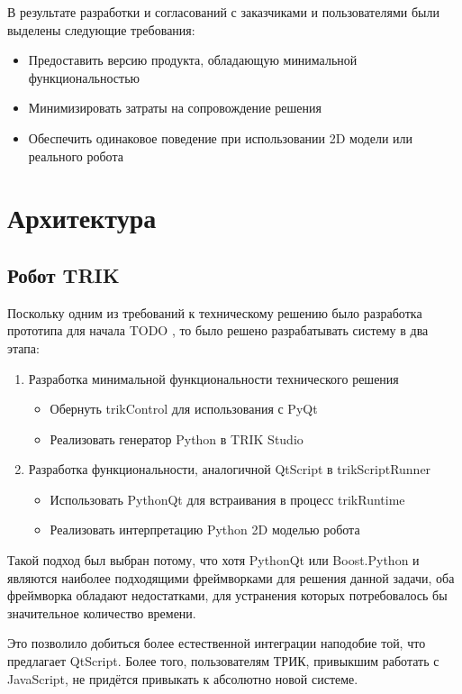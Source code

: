 \documentclass[14pt]{matmex-diploma-custom}
\begin{document}
В результате разработки и согласований с заказчиками и пользователями были выделены следующие требования:
\begin{itemize}
    \item Предоставить версию продукта, обладающую минимальной функциональностью
    \item Минимизировать затраты на сопровождение решения
    \item Обеспечить одинаковое поведение при использовании 2D модели или реального робота
\end{itemize}



\section{Архитектура}
\subsection{Робот TRIK}
Поскольку одним из требований к техническому решению было разработка прототипа для начала TODO , то было решено разрабатывать систему в два этапа:
\begin{enumerate}
    \item Разработка минимальной функциональности технического решения
    \begin{itemize}
        \item Обернуть trikControl для использования с PyQt
        \item Реализовать генератор Python в TRIK Studio
    \end{itemize}
    \item Разработка функциональности, аналогичной QtScript в trikScriptRunner
    \begin{itemize}
        \item Использовать PythonQt для встраивания в процесс trikRuntime
        \item Реализовать интерпретацию Python 2D моделью робота
    \end{itemize}
\end{enumerate} 

Такой подход был выбран потому, что хотя PythonQt или Boost.Python и являются наиболее подходящими фреймворками для решения данной задачи, оба фреймворка обладают недостатками, для устранения которых потребовалось бы значительное количество времени. 

Это позволило добиться более естественной интеграции наподобие той, что предлагает QtScript. Более того, пользователям ТРИК, привыкшим работать с JavaScript, не придётся привыкать к абсолютно новой системе. 
\end{document}
